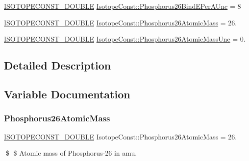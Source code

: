 \begin{DoxyCompactItemize}
\mbox{\hyperlink{group___isotope_const-_macros_ga8f45a7272ce02c0b4c65c44636ed719a}{I\+S\+O\+T\+O\+P\+E\+C\+O\+N\+S\+T\+\_\+\+D\+O\+U\+B\+LE}} \mbox{\hyperlink{group___isotope_const-_phosphorus-_p26_ga951808dd17bd49e963394a47869554c2}{Isotope\+Const\+::\+Phosphorus26\+Bind\+E\+Per\+A\+Unc}} = 8
\item 
\mbox{\hyperlink{group___isotope_const-_macros_ga8f45a7272ce02c0b4c65c44636ed719a}{I\+S\+O\+T\+O\+P\+E\+C\+O\+N\+S\+T\+\_\+\+D\+O\+U\+B\+LE}} \mbox{\hyperlink{group___isotope_const-_phosphorus-_p26_ga487fbf6007e7227ce2bf3569cd250114}{Isotope\+Const\+::\+Phosphorus26\+Atomic\+Mass}} = 26.
\item 
\mbox{\hyperlink{group___isotope_const-_macros_ga8f45a7272ce02c0b4c65c44636ed719a}{I\+S\+O\+T\+O\+P\+E\+C\+O\+N\+S\+T\+\_\+\+D\+O\+U\+B\+LE}} \mbox{\hyperlink{group___isotope_const-_phosphorus-_p26_ga7c3093f69af49ec73354d4d3582e524f}{Isotope\+Const\+::\+Phosphorus26\+Atomic\+Mass\+Unc}} = 0.
\end{DoxyCompactItemize}


\subsection{Detailed Description}


\subsection{Variable Documentation}
\mbox{\label{group___isotope_const-_phosphorus-_p26_ga487fbf6007e7227ce2bf3569cd250114}} 
\subsubsection{\texorpdfstring{Phosphorus26\+Atomic\+Mass}{Phosphorus26AtomicMass}}
{\footnotesize\ttfamily \mbox{\hyperlink{group___isotope_const-_macros_ga8f45a7272ce02c0b4c65c44636ed719a}{I\+S\+O\+T\+O\+P\+E\+C\+O\+N\+S\+T\+\_\+\+D\+O\+U\+B\+LE}} Isotope\+Const\+::\+Phosphorus26\+Atomic\+Mass = 26.}

\$ \$ Atomic mass of Phosphorus-\/26 in amu. \mbox{\label{group___isotope_const-_phosphorus-_p26_ga7c3093f69af49ec73354d4d3582e524f}} 
